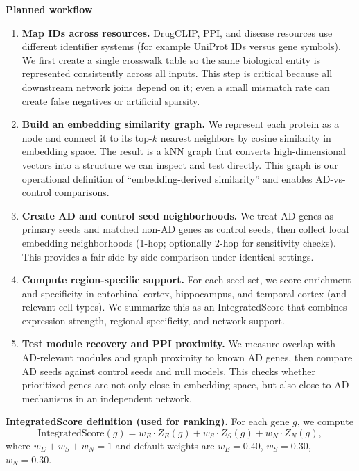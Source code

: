 \documentclass{article}
\begin{document}
\textbf{Planned workflow}
\begin{enumerate}
    \item \textbf{Map IDs across resources.} DrugCLIP, PPI, and disease resources use different identifier systems (for example UniProt IDs versus gene symbols). We first create a single crosswalk table so the same biological entity is represented consistently across all inputs. This step is critical because all downstream network joins depend on it; even a small mismatch rate can create false negatives or artificial sparsity.
    \item \textbf{Build an embedding similarity graph.} We represent each protein as a node and connect it to its top-$k$ nearest neighbors by cosine similarity in embedding space. The result is a kNN graph that converts high-dimensional vectors into a structure we can inspect and test directly. This graph is our operational definition of ``embedding-derived similarity'' and enables AD-vs-control comparisons.
    \item \textbf{Create AD and control seed neighborhoods.} We treat AD genes as primary seeds and matched non-AD genes as control seeds, then collect local embedding neighborhoods (1-hop; optionally 2-hop for sensitivity checks). This provides a fair side-by-side comparison under identical settings.
    \item \textbf{Compute region-specific support.} For each seed set, we score enrichment and specificity in entorhinal cortex, hippocampus, and temporal cortex (and relevant cell types). We summarize this as an IntegratedScore that combines expression strength, regional specificity, and network support.
    \item \textbf{Test module recovery and PPI proximity.} We measure overlap with AD-relevant modules and graph proximity to known AD genes, then compare AD seeds against control seeds and null models. This checks whether prioritized genes are not only close in embedding space, but also close to AD mechanisms in an independent network.
\end{enumerate}

\textbf{IntegratedScore definition (used for ranking).}
For each gene $g$, we compute
\[
    \mathrm{IntegratedScore}(g)=
    w_E \cdot Z_E(g) +
    w_S \cdot Z_S(g) +
    w_N \cdot Z_N(g),
\]
where $w_E+w_S+w_N=1$ and default weights are $w_E=0.40$, $w_S=0.30$, $w_N=0.30$.
\end{document}
